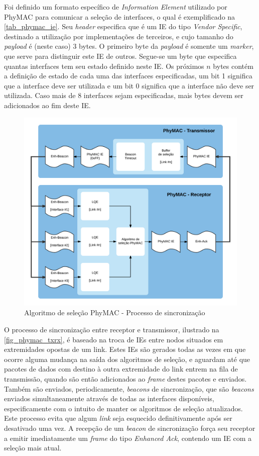 \documentclass[
	12pt,				%
	openright,			%
	oneside,
	a4paper,			%
	english,			%
	french,				%
	spanish,			%
	brazil				%
	]{abntex2}
\begin{document}
Foi definido um formato específico de \textit{Information Element} utilizado por PhyMAC para comunicar a seleção de interfaces, o qual é exemplificado na \autoref{tab_phymac_ie}. Seu \textit{header} especifica que é um IE do tipo \textit{Vendor Specific}, destinado a utilização por implementações de terceiros, e cujo tamanho do \textit{payload} é (neste caso) 3 bytes. O primeiro byte da \textit{payload} é somente um \textit{marker}, que serve para distinguir este IE de outros. Segue-se um byte que especifica quantas interfaces tem seu estado definido neste IE. Os próximos $n$ bytes contém a definição de estado de cada uma das interfaces especificadas, um bit 1 significa que a interface deve ser utilizada e um bit 0 significa que a interface não deve ser utilizada. Caso mais de 8 interfaces sejam especificadas, mais bytes devem ser adicionados ao fim deste IE.

\begin{figure}[hb]
	\centering
	\caption{Algoritmo de seleção PhyMAC - Processo de sincronização}
	\label{fig_phymac_txrx}
	\includegraphics[width=.9\linewidth]{PhyMAC_TXRX}
\end{figure}

O processo de sincronização entre receptor e transmissor, ilustrado na \autoref{fig_phymac_txrx}, é baseado na troca de IEs entre nodos situados em extremidades opostas de um link. Estes IEs são gerados todas as vezes  em que ocorre alguma mudança na saída dos algoritmos de seleção, e aguardam até que pacotes de dados com destino à outra extremidade do link entrem na fila de transmissão, quando são então adicionados ao \textit{frame} destes pacotes e enviados. Também são enviados, periodicamente, \textit{beacons} de sincronização, que são \textit{beacons} enviados simultaneamente através de todas as interfaces disponíveis, especificamente com o intuito de manter os algoritmos de seleção atualizados. Este processo evita que algum \textit{link} seja esquecido definitivamente após ser desativado uma vez. A recepção de um \textit{beacon} de sincronização força seu receptor a emitir imediatamente um \textit{frame} do tipo \textit{Enhanced Ack}, contendo um IE com a seleção mais atual.
\end{document}
